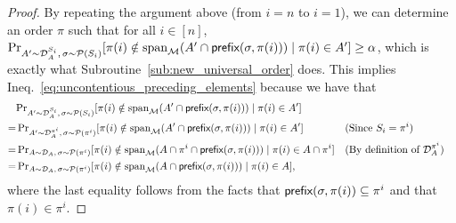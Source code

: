 \documentclass[11pt]{article}
\newcommand{\D}{\mathcal D}
\newcommand{\M}{{\mathcal M}}
\newcommand{\cP}{\mathcal P}
\newcommand{\pref}{\textnormal{\sffamily prefix}}
\newcommand{\spa}{\textnormal{span}}
\begin{document}
\begin{proof}
By repeating the argument above (from $i=n$ to $i=1$), we can determine an order $\pi$ such that for all $i\in [n]$, ${\Pr}_{A'\sim \D_A^{S_i},\,\sigma\sim\cP(S_i)}[\pi(i)\notin\spa_{\M}(A'\cap\pref(\sigma,\pi(i)))\mid \pi(i)\in A']\ge \alpha$, which is exactly what Subroutine~\ref{sub:new_universal_order} does. This implies Ineq.~\eqref{eq:uncontentious_preceding_elements} because we have that
\begin{align*}
    &{\Pr}_{A'\sim \D_A^{S_i},\,\sigma\sim\cP(S_i)}[\pi(i)\notin\spa_{\M}(A'\cap\pref(\sigma,\pi(i)))\mid \pi(i)\in A']\\
    =&\,{\Pr}_{A'\sim \D_A^{\pi^i},\,\sigma\sim\cP(\pi^i)}[\pi(i)\notin\spa_{\M}(A'\cap\pref(\sigma,\pi(i)))\mid \pi(i)\in A'] &&\text{(Since $S_i=\pi^i$)}\\
    =&\,{\Pr}_{A\sim \D_A,\,\sigma\sim\cP(\pi^i)}[\pi(i)\notin\spa_{\M}(A\cap\pi^i\cap\pref(\sigma,\pi(i)))\mid \pi(i)\in A\cap\pi^i] &&\text{(By definition of $\D_A^{\pi^i}$)}\\
    =&\,{\Pr}_{A\sim \D_A,\,\sigma\sim\cP(\pi^i)}[\pi(i)\notin\spa_{\M}(A\cap\pref(\sigma,\pi(i)))\mid \pi(i)\in A],
\end{align*}
where the last equality follows from the facts that $\pref(\sigma,\pi(i))\subseteq\pi^i$ and that $\pi(i)\in\pi^i$.
\end{proof}
\end{document}
